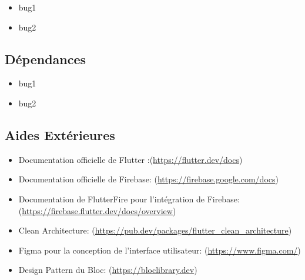 \begin{itemize}[noitemsep]
    \item bug1
    \item bug2
\end{itemize}

\subsection{Dépendances}

\begin{itemize}[noitemsep]
    \item bug1
    \item bug2
\end{itemize}

\subsection{Aides Extérieures}

\begin{itemize}[noitemsep]
    \item Documentation officielle de Flutter :(\url{https://flutter.dev/docs})
    \item Documentation officielle de Firebase: (\url{https://firebase.google.com/docs})
    \item Documentation de FlutterFire pour l'intégration de Firebase: (\url{https://firebase.flutter.dev/docs/overview})
    \item Clean Architecture: (\url{https://pub.dev/packages/flutter_clean_architecture})
    \item Figma pour la conception de l'interface utilisateur: (\url{https://www.figma.com/})
    \item Design Pattern du Bloc: (\url{https://bloclibrary.dev})
\end{itemize}